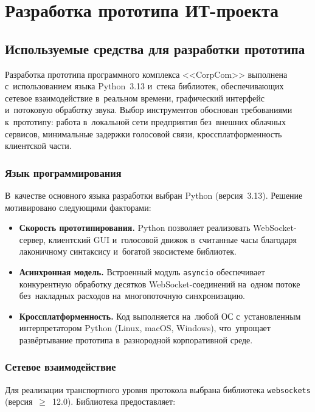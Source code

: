 \newpage
\tableofcontents
\newpage

\section{Разработка прототипа ИТ-проекта}

\subsection{Используемые средства для разработки прототипа}

Разработка прототипа программного комплекса <<CorpCom>> выполнена с~использованием языка Python~3.13 и~стека библиотек, обеспечивающих сетевое взаимодействие в~реальном времени, графический интерфейс и~потоковую обработку звука. Выбор инструментов обоснован требованиями к~прототипу: работа в~локальной сети предприятия без~внешних облачных сервисов, минимальные задержки голосовой связи, кроссплатформенность клиентской части.

\subsubsection{Язык программирования}

В~качестве основного языка разработки выбран Python (версия~3.13). Решение мотивировано следующими факторами:

\begin{itemize}
  \item \textbf{Скорость прототипирования.} Python позволяет реализовать WebSocket-сервер, клиентский GUI и~голосовой движок в~считанные часы благодаря лаконичному синтаксису и~богатой экосистеме библиотек.
  \item \textbf{Асинхронная модель.} Встроенный модуль \texttt{asyncio} обеспечивает конкурентную обработку десятков WebSocket-соединений на~одном потоке без~накладных расходов на~многопоточную синхронизацию.
  \item \textbf{Кроссплатформенность.} Код выполняется на~любой ОС с~установленным интерпретатором Python (Linux, macOS, Windows), что~упрощает развёртывание прототипа в~разнородной корпоративной среде.
\end{itemize}

\subsubsection{Сетевое взаимодействие}

Для реализации транспортного уровня протокола выбрана библиотека \texttt{websockets} (версия~$\ge$~12.0). Библиотека предоставляет:

